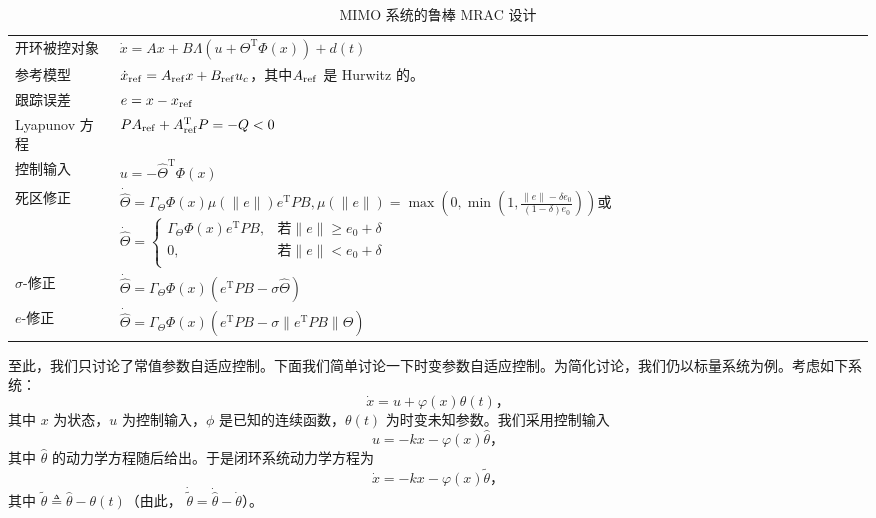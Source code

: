 \begin{table}[htbp]
  \centering
  \setcellgapes{4pt}
  \makegapedcells
  \caption{MIMO 系统的鲁棒 MRAC 设计}
  \label{table:MIMO_robust_MRAC}
  \begin{tabular}{p{4.0cm}p{10.0cm}}
  \hline
   开环被控对象 & $\dot{x} =  A x + B \Lambda \left( u + \Theta^\mathrm{T} \Phi(x) \right) + d(t)$\\
    参考模型 & $\dot{x}_{\operatorname{ref}} = 
    A_{\operatorname{ref}} x +
    B_{\operatorname{ref}} u_c$，其中$A_{\operatorname{ref}}$ 是 Hurwitz 的。\\
    跟踪误差 & $e = x - x_{\operatorname{ref}}$\\
    Lyapunov 方程 & $P A_{\operatorname{ref}} + A_{\operatorname{ref}}^{\mathrm{T}} P = -Q < 0$\\
    控制输入 & $u = -{\hat{\Theta}}^{\mathrm{T}} \Phi(x)$\\
    死区修正 & $\dot{\hat{\Theta}} = \Gamma_\Theta \Phi(x) \mu\left( \| e \| \right) e^{\mathrm{T}} P B,\mu\left( \| e \| \right)=\max\left(0,\min\left(1,\frac{\|e\|-\delta e_0}{(1-\delta)e_0}\right)\right)$或$\dot{\hat{\Theta}} = \left\{\begin{matrix}
\Gamma_\Theta \Phi(x) e^{\mathrm{T}} P B, & \text{若} \| e \| \geq e_{0} + \delta \\
0, & \text{若} \| e \| < e_{0} + \delta \\
\end{matrix}\right.$\\
    $\sigma$-修正 & $\dot{\hat{\Theta}} = \Gamma_\Theta \Phi(x) \left( e^{\mathrm{T}} P B -\sigma \hat{\Theta} \right)$\\
    $e$-修正 & $\dot{\hat{\Theta}} = \Gamma_\Theta \Phi(x) \left( e^{\mathrm{T}} P B -\sigma \| e^{\mathrm{T}} P B \| \hat{\Theta} \right)$\\
    \hline
  \end{tabular}
\end{table}

至此，我们只讨论了常值参数自适应控制。下面我们简单讨论一下时变参数自适应控制。为简化讨论，我们仍以标量系统为例。考虑如下系统：
\begin{equation}
    \dot{x} = u + \varphi(x) \theta(t) \text{，}
\end{equation}
其中 $x$ 为状态，$u$ 为控制输入，$\phi$ 是已知的连续函数，$\theta(t)$ 为时变未知参数。我们采用控制输入
\[
    u = -k x - \varphi(x) \hat{\theta} \text{，}
\]
其中 $\hat{\theta}$ 的动力学方程随后给出。于是闭环系统动力学方程为
\[
    \dot{x} = -k x - \varphi(x) \tilde{\theta} \text{，}
\]
其中 $\tilde{\theta} \triangleq \hat{\theta} - \theta(t)$（由此， $\dot{\tilde{\theta}} = \dot{\hat{\theta}} - \dot{\theta}$）。

